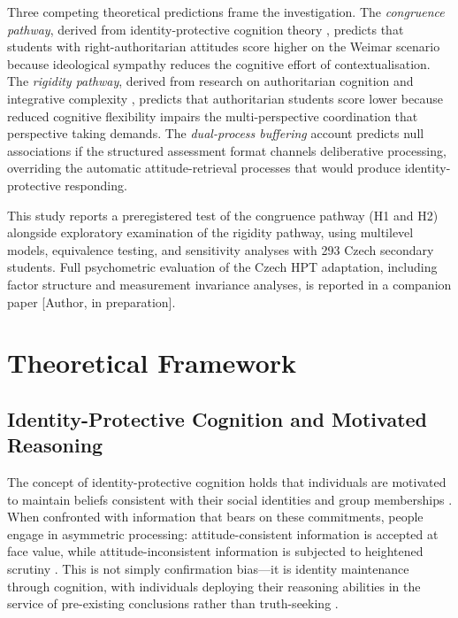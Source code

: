 \documentclass[referee,pdflatex,sn-apa]{sn-jnl}
\begin{document}
Three competing theoretical predictions frame the investigation. The \textit{congruence pathway}, derived from identity-protective cognition theory \citep{Kahan2017,Jost2003}, predicts that students with right-authoritarian attitudes score higher on the Weimar scenario because ideological sympathy reduces the cognitive effort of contextualisation. The \textit{rigidity pathway}, derived from research on authoritarian cognition and integrative complexity \citep{Suedfeld1977,Duckitt2001,VanHiel2016}, predicts that authoritarian students score lower because reduced cognitive flexibility impairs the multi-perspective coordination that perspective taking demands. The \textit{dual-process buffering} account \citep{Evans2013} predicts null associations if the structured assessment format channels deliberative processing, overriding the automatic attitude-retrieval processes that would produce identity-protective responding.

This study reports a preregistered test of the congruence pathway (H1 and H2) alongside exploratory examination of the rigidity pathway, using multilevel models, equivalence testing, and sensitivity analyses with 293 Czech secondary students. Full psychometric evaluation of the Czech HPT adaptation, including factor structure and measurement invariance analyses, is reported in a companion paper [Author, in preparation].

\section{Theoretical Framework}\label{sec:theory}

\subsection{Identity-Protective Cognition and Motivated Reasoning}\label{subsec:ipc}

The concept of identity-protective cognition holds that individuals are motivated to maintain beliefs consistent with their social identities and group memberships \citep{Kahan2017}. When confronted with information that bears on these commitments, people engage in asymmetric processing: attitude-consistent information is accepted at face value, while attitude-inconsistent information is subjected to heightened scrutiny \citep{Kunda1990,LodgeTaber2013}. This is not simply confirmation bias---it is identity maintenance through cognition, with individuals deploying their reasoning abilities in the service of pre-existing conclusions rather than truth-seeking \citep{Stanovich2013}.
\end{document}
